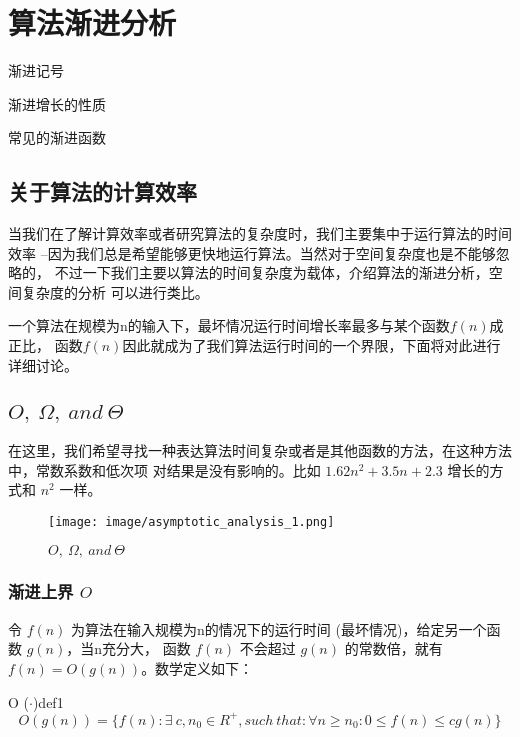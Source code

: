 \chapter{算法渐进分析}

\begin{introduction}
   \item 渐进记号
   \item 渐进增长的性质
   \item 常见的渐进函数
\end{introduction}

\section{关于算法的计算效率}
当我们在了解计算效率或者研究算法的复杂度时，我们主要集中于运行算法的时间效率
--因为我们总是希望能够更快地运行算法。当然对于空间复杂度也是不能够忽略的，
不过一下我们主要以算法的时间复杂度为载体，介绍算法的渐进分析，空间复杂度的分析
可以进行类比。

一个算法在规模为n的输入下，最坏情况运行时间增长率最多与某个函数$f(n)$成正比，
函数$f(n)$因此就成为了我们算法运行时间的一个界限，下面将对此进行详细讨论。

\section{\texorpdfstring{$O,\ \Omega,\ and\ \Theta $}{O, Ω, and θ}}
在这里，我们希望寻找一种表达算法时间复杂或者是其他函数的方法，在这种方法中，常数系数和低次项
对结果是没有影响的。比如 $1.62n^2+3.5n+2.3$ 增长的方式和 $n^2$ 一样。

\begin{figure}[h]
   \begin{minipage}[t]{1\linewidth}
      \centering
      \texttt{[image: image/asymptotic\_analysis\_1.png]}
      \caption{$O,\ \Omega,\ and\ \Theta $}
   \end{minipage}
\end{figure}

\subsection{渐进上界 $O$}
令 $f(n)$ 为算法在输入规模为n的情况下的运行时间 (最坏情况)，给定另一个函数 $g(n)$，当n充分大，
函数 $f(n)$ 不会超过 $g(n)$ 的常数倍，就有 $f(n)=O(g(n))$。数学定义如下：

\begin{definition}{O ($\cdot$)}{def1}
   \[
   O(g(n))= \{f(n): \exists\ c,n_0\in R^+,such\ that: \forall n\ge n_0:0\le f(n)\le cg(n)\}
   \]
\end{definition}


